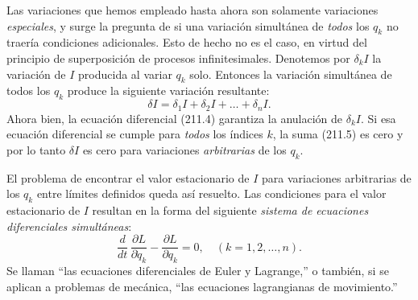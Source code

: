 \documentclass[12pt,a4paper]{book}
\begin{document}
Las variaciones que hemos empleado hasta ahora son solamente variaciones \textit{especiales}, y surge la pregunta de si una variación simultánea de \textit{todos} los $q_k$ no traería condiciones adicionales. Esto de hecho no es el caso, en virtud del principio de superposición de procesos infinitesimales. Denotemos por $\delta_k I$ la variación de $I$ producida al variar $q_k$ solo. Entonces la variación simultánea de todos los $q_k$ produce la siguiente variación resultante:
\begin{equation}
\delta I = \delta_1 I + \delta_2 I + \ldots + \delta_n I. \tag{211.5}
\end{equation}
Ahora bien, la ecuación diferencial (211.4) garantiza la anulación de $\delta_k I$. Si esa ecuación diferencial se cumple para \textit{todos} los índices $k$, la suma (211.5) es cero y por lo tanto $\delta I$ es cero para variaciones \textit{arbitrarias} de los $q_k$.

El problema de encontrar el valor estacionario de $I$ para variaciones arbitrarias de los $q_k$ entre límites definidos queda así resuelto. Las condiciones para el valor estacionario de $I$ resultan en la forma del siguiente \textit{sistema de ecuaciones diferenciales simultáneas}:
\begin{equation}
\frac{d}{dt} \, \frac{\partial L}{\partial \dot{q}_k} - \frac{\partial L}{\partial q_k} = 0, \quad (k = 1, 2, \ldots, n). \tag{211.6}
\end{equation}
Se llaman ``las ecuaciones diferenciales de Euler y Lagrange,'' o también, si se aplican a problemas de mecánica, ``las ecuaciones lagrangianas de movimiento.''
\end{document}
